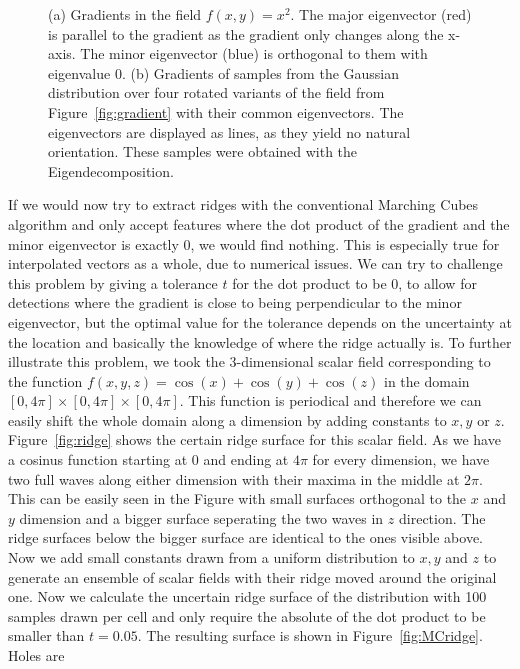 \begin{figure}
\begin{subfigure}[b]{0.49\textwidth}
        \caption{}
        \label{fig:samples}
    \end{subfigure}
    \caption{(a) Gradients in the field $f(x,y)=x^2$. The major
    eigenvector (red) is parallel to the gradient as the gradient only
    changes along the x-axis. The minor eigenvector (blue) is orthogonal
    to them with eigenvalue 0. (b) Gradients of samples from the
    Gaussian distribution over four rotated variants of the field from
    Figure~\ref{fig:gradient} with their common eigenvectors. The
    eigenvectors are displayed as lines, as they yield no natural
    orientation. These samples were obtained with the
    Eigendecomposition.}
    \label{fig:sampComp}
\end{figure}
If we would now try to extract ridges with the conventional Marching
Cubes algorithm and only accept features where the dot product of the
gradient and the minor eigenvector is exactly 0, we would find nothing.
This is especially true for interpolated vectors as a whole, due to
numerical issues. We can try to challenge this problem by giving a
tolerance $t$ for the dot product to be 0, to allow for detections where
the gradient is close to being perpendicular to the minor eigenvector,
but the optimal value for the tolerance depends on the uncertainty at
the location and basically the knowledge of where the ridge actually is.
To further illustrate this problem, we took the 3-dimensional scalar
field corresponding to the function $f(x,y,z) = \cos{(x)} + \cos{(y)} +
\cos{(z)}$ in the domain $[0, 4 \pi] \times [0, 4\pi] \times [0, 4\pi]$.
This function is periodical and therefore we can easily shift the whole
domain along a dimension by adding constants to $x, y$ or $z$.
Figure~\ref{fig:ridge} shows the certain ridge surface for this scalar
field. As we have a cosinus function starting at 0 and ending at $4\pi$
for every dimension, we have two full waves along either dimension with
their maxima in the middle at $2\pi$. This can be easily seen in the
Figure with small surfaces orthogonal to the $x$ and $y$ dimension and a
bigger surface seperating the two waves in $z$ direction. The ridge
surfaces below the bigger surface are identical to the ones visible
above. Now we add small constants drawn from a uniform distribution to
$x, y$ and $z$ to generate an ensemble of scalar fields with their ridge
moved around the original one. Now we calculate the uncertain ridge
surface of the distribution with 100 samples drawn per cell and only
require the absolute of the dot product to be smaller than $t=0.05$. The
resulting surface is shown in Figure~\ref{fig:MCridge}. Holes are
